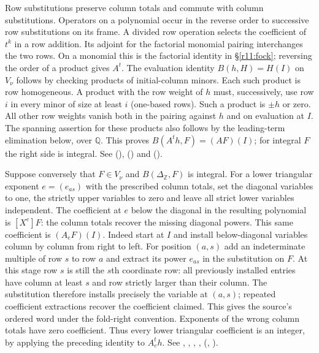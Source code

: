 Row substitutions preserve column totals and commute with column substitutions. Operators on a polynomial occur in the reverse order to successive row substitutions on its frame. A divided row operation selects the coefficient of $t^k$ in a row
addition. Its adjoint for the factorial monomial pairing interchanges
the two rows. On a monomial this is the factorial identity in
\S\ref{r11:fock}; reversing the order of a product gives $A^t$.
The evaluation identity $B(h,H)=H(I)$ on $V_\nu$ follows by checking
products of initial-column minors. Each such product is row homogeneous.
A product with the row weight of $h$ must, successively, use row $i$ in
every minor of size at least $i$ (one-based rows). Such a product is
$\pm h$ or zero. All other row weights vanish both in the pairing against
$h$ and on evaluation at $I$. The spanning assertion for these products
also follows by the leading-term elimination below, over $\mathbb Q$.
This proves $B(A^t h,F)=(AF)(I)$; for integral $F$ the right side is
integral. See  (),
 () and
 ().

Suppose conversely that $F\in V_\nu$ and $B(\Delta_{\mathbb Z},F)$
is integral. For a lower triangular exponent $e=(e_{as})$ with the
prescribed column totals, set the diagonal variables to one, the
strictly upper variables to zero and leave all strict lower variables
independent. The coefficient at $e$ below the diagonal in the resulting
polynomial is $[X^e]F$: the column totals recover the missing diagonal
powers. This same coefficient is $(A_e F)(I)$. Indeed start at $I$
and install below-diagonal variables column by column from right to left.
For position $(a,s)$ add an indeterminate multiple of row $s$ to row
$a$ and extract its power $e_{as}$ in the substitution on $F$.
At this stage row $s$ is still the $s$th coordinate row: all previously
installed entries have column at least $s$ and row strictly larger
than their column. The substitution therefore installs precisely
the variable at $(a,s)$; repeated coefficient extractions recover the
coefficient claimed. This gives the source's ordered word under the
fold-right convention. Exponents of the wrong column totals have zero
coefficient. Thus every lower triangular coefficient is an integer,
by applying the preceding identity to $A_e^th$.
See , , ,
, 
(,
).

